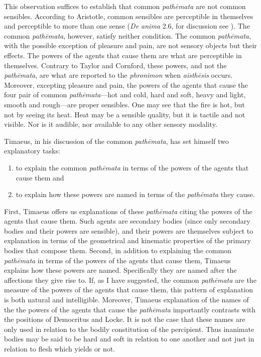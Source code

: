 This observation suffices to establish that common \emph{pathēmata} are not common sensibles. According to Aristotle, common sensibles are perceptible in themselves and perceptible to more than one sense (\emph{De anima} 2.6, for discussion see \citealt[chapter 4.2]{Kalderon:2015fr}). The common \emph{pathēmata}, however, satisfy neither condition. The common \emph{pathēmata}, with the possible exception of pleasure and pain, are not sensory objects but their effects. The powers of the agents that cause them are what are perceptible in themselves. Contrary to Taylor and Cornford, these powers, and not the \emph{pathēmata}, are what are reported to the \emph{phronimon} when \emph{aisthēsis} occurs. Moreover, excepting pleasure and pain, the powers of the agents that cause the four pair of common \emph{pathēmata}---hot and cold, hard and soft, heavy and light, smooth and rough---are proper sensibles. One may see that the fire is hot, but not by seeing its heat. Heat may be a sensible quality, but it is tactile and not visible. Nor is it audible, nor available to any other sensory modality.

Timaeus, in his discussion of the common \emph{pathēmata}, has set himself two explanatory tasks:
\begin{enumerate}[(1)]
	\item to explain the common \emph{pathēmata} in terms of the powers of the agents that cause them and
	\item to explain how these powers are named in terms of the \emph{pathēmata} they cause.
\end{enumerate}
First, Timaeus offers us explanations of these \emph{pathēmata} citing the powers of the agents that cause them. Such agents are secondary bodies (since only secondary bodies and their powers are sensible), and their powers are themselves subject to explanation in terms of the geometrical and kinematic properties of the primary bodies that compose them. Second, in addition to explaining the common \emph{pathēmata} in terms of the powers of the agents that cause them, Timaeus explains how these powers are named. Specifically they are named after the affections they give rise to. If, as I have suggested, the common \emph{pathēmata} are the measure of the powers of the agents that cause them, this pattern of explanation is both natural and intelligible. Moreover, Timaeus explanation of the names of the the powers of the agents that cause the \emph{pathēmata} importantly contrasts with the positions of Democritus and Locke. It is not the case that these names are only used in relation to the bodily constitution of the percipient. Thus inanimate bodies may be said to be hard and soft in relation to one another and not just in relation to flesh which yields or not.

